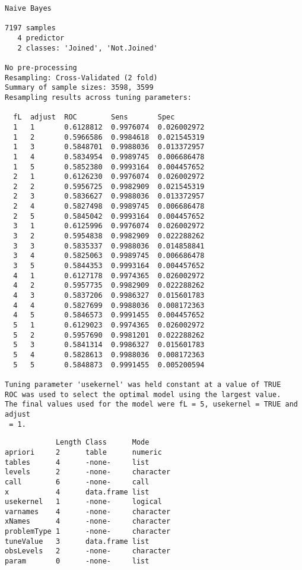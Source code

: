 \documentclass[11pt]{article}
\begin{document}
    
    \begin{verbatim}
Naive Bayes 

7197 samples
   4 predictor
   2 classes: 'Joined', 'Not.Joined' 

No pre-processing
Resampling: Cross-Validated (2 fold) 
Summary of sample sizes: 3598, 3599 
Resampling results across tuning parameters:

  fL  adjust  ROC        Sens       Spec       
  1   1       0.6128812  0.9976074  0.026002972
  1   2       0.5966586  0.9984618  0.021545319
  1   3       0.5848701  0.9988036  0.013372957
  1   4       0.5834954  0.9989745  0.006686478
  1   5       0.5852380  0.9993164  0.004457652
  2   1       0.6126230  0.9976074  0.026002972
  2   2       0.5956725  0.9982909  0.021545319
  2   3       0.5836627  0.9988036  0.013372957
  2   4       0.5827498  0.9989745  0.006686478
  2   5       0.5845042  0.9993164  0.004457652
  3   1       0.6125996  0.9976074  0.026002972
  3   2       0.5954838  0.9982909  0.022288262
  3   3       0.5835337  0.9988036  0.014858841
  3   4       0.5825063  0.9989745  0.006686478
  3   5       0.5844353  0.9993164  0.004457652
  4   1       0.6127178  0.9974365  0.026002972
  4   2       0.5957735  0.9982909  0.022288262
  4   3       0.5837206  0.9986327  0.015601783
  4   4       0.5827699  0.9988036  0.008172363
  4   5       0.5846573  0.9991455  0.004457652
  5   1       0.6129023  0.9974365  0.026002972
  5   2       0.5957690  0.9981201  0.022288262
  5   3       0.5841314  0.9986327  0.015601783
  5   4       0.5828613  0.9988036  0.008172363
  5   5       0.5848873  0.9991455  0.005200594

Tuning parameter 'usekernel' was held constant at a value of TRUE
ROC was used to select the optimal model using the largest value.
The final values used for the model were fL = 5, usekernel = TRUE and adjust
 = 1.
    \end{verbatim}

    
    
    \begin{verbatim}
            Length Class      Mode     
apriori     2      table      numeric  
tables      4      -none-     list     
levels      2      -none-     character
call        6      -none-     call     
x           4      data.frame list     
usekernel   1      -none-     logical  
varnames    4      -none-     character
xNames      4      -none-     character
problemType 1      -none-     character
tuneValue   3      data.frame list     
obsLevels   2      -none-     character
param       0      -none-     list     
    \end{verbatim}
\end{document}
